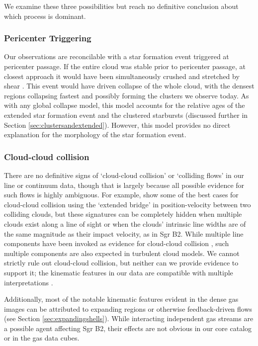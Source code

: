 \documentclass[twocolumn]{aastex61}
\begin{document}
We examine these three possibilities but reach no definitive conclusion about
which process is dominant.

\subsubsection{Pericenter Triggering}
\label{sec:pericenter}
Our observations are reconcilable with a star formation event triggered at
pericenter passage.  If the entire cloud was stable prior to pericenter
passage, at closest approach it would have been simultaneously crushed and
stretched by shear \citep{Kruijssen2015a}.  This event would have driven
collapse of the whole cloud, with the densest regions collapsing fastest and
possibly forming the clusters we observe today.  As with any global collapse
model, this model accounts for the relative ages of the extended star formation
event and the clustered starbursts (discussed further in Section
\ref{sec:clustersandextended}). However, this model provides no direct
explanation for the morphology of the star formation event.

\subsubsection{Cloud-cloud collision}
\label{sec:ccc}
There are no definitive signs of `cloud-cloud collision' or `colliding flows'
in our line or continuum data, though that is largely because all possible
evidence for such flows is highly ambiguous. For example, \citet{Haworth2015c}
show some of the best cases for cloud-cloud collision using the `extended bridge'
in position-velocity between two colliding clouds, but these signatures can be 
completely hidden when multiple clouds exist along a line of sight or when
the clouds' intrinsic line widths are of the same magnitude as their impact velocity,
as in Sgr B2.  While multiple line components have been invoked as evidence
for cloud-cloud collision \citep{Hasegawa1994a,Corby2015a}, such multiple
components are also expected in turbulent cloud models.
We cannot strictly rule out cloud-cloud collision, but neither
can we provide evidence to support it; the kinematic features in our data are
compatible with multiple interpretations \citep[see also][who argued
that the multiple components cited as cloud-cloud collision evidence
could also be produced by opacity effects]{Henshaw2016a}.

Additionally, most of the notable kinematic features evident in the dense gas
images can be attributed to expanding \hii regions or otherwise feedback-driven
flows (see Section \ref{sec:expandingshells}).  While interacting independent
gas streams are a possible agent affecting Sgr B2, their effects are not
obvious in our core catalog or in the gas data cubes.
\end{document}
